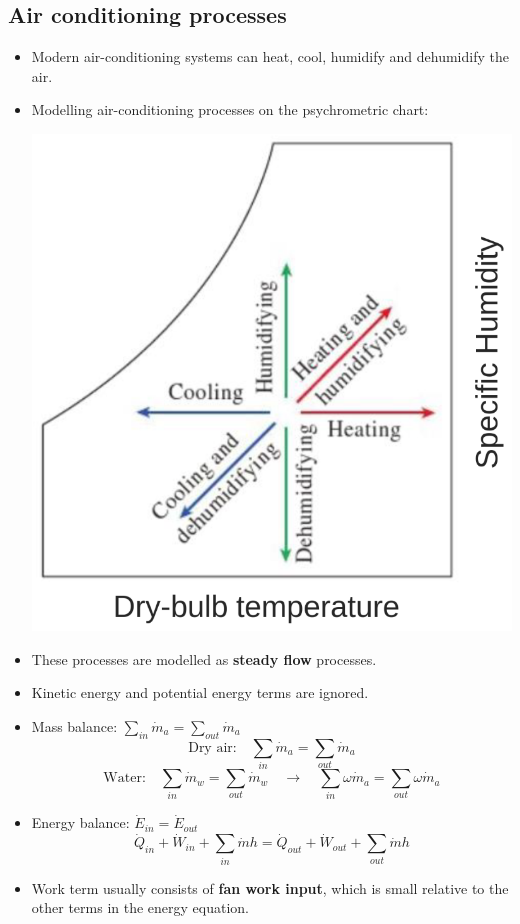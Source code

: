 \documentclass[11pt]{article}
\begin{document}
\subsection{Air conditioning processes}
\label{sec:org5eea869}
\begin{itemize}
\item Modern air-conditioning systems can heat, cool, humidify and dehumidify the air.
\item Modelling air-conditioning processes on the psychrometric chart:
\begin{center}
\includegraphics[scale=0.65]{./images/air-conditioning-processes-on-a-psychrometric-chart.png}
\end{center}
\item These processes are modelled as \textbf{steady flow} processes.
\item Kinetic energy and potential energy terms are ignored.
\item Mass balance: \(\sum_{in} \dot{m}_a = \sum_{out} \dot{m}_a\)
\[\text{Dry air:} \quad \sum_{in} \dot{m}_a = \sum_{out} \dot{m}_a\]
\[\text{Water:} \quad \sum_{in} \dot{m}_w = \sum_{out} \dot{m}_w \quad \rightarrow \quad \sum_{in} \omega \dot{m}_a = \sum_{out} \omega \dot{m}_a\]
\item Energy balance: \(\dot{E}_{in} = \dot{E}_{out}\)
\[\dot{Q}_{in} + \dot{W}_{in} + \sum_{in} \dot{m} h = \dot{Q}_{out} + \dot{W}_{out} + \sum_{out} \dot{m} h\]
\item Work term usually consists of \textbf{fan work input}, which is small relative to the other terms in the energy equation.
\end{itemize}
\end{document}
